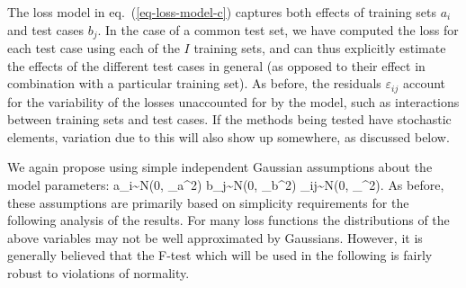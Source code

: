 The loss model in eq.~(\ref{eq-loss-model-c}) captures both effects of
training sets $a_i$ and test cases $b_j$. In the case of a common test
set, we have computed the loss for each test case using each of the
$I$ training sets, and can thus explicitly estimate the effects of the
different test cases in general (as opposed to their effect in
combination with a particular training set). As before, the residuals
$\varepsilon_{ij}$ account for the variability of the losses
unaccounted for by the model, such as interactions between training
sets and test cases.  If the methods being tested have stochastic
elements, variation due to this will also show up somewhere, as discussed 
below.

We again propose using simple independent Gaussian assumptions about the
model parameters:
\beq
a_i\sim {\cal N}(0, \sigma_a^2) \hspace{2cm} b_j\sim {\cal N}(0, \sigma_b^2)
\hspace{2cm} \varepsilon_{ij}\sim {\cal N}(0, \sigma_\varepsilon^2).
\label{eq-model}
\eeq
As before, these assumptions are primarily based on simplicity
requirements for the following analysis of the results.  For many loss
functions the distributions of the above variables may not be well
approximated by Gaussians. However, it is generally believed that the
F-test which will be used in the following is fairly robust to
violations of normality.

